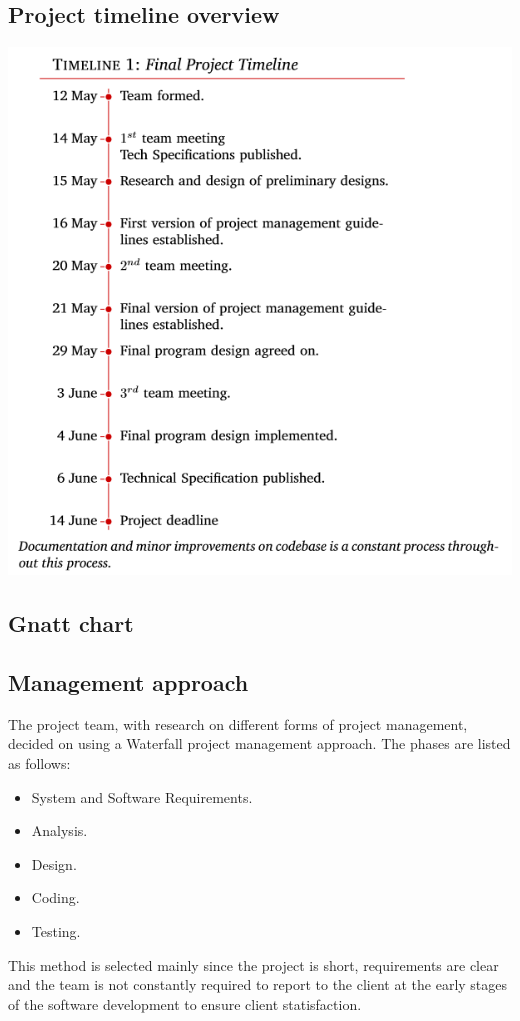 \documentclass[12pt,a4paper]{article}
\begin{document}
	\subsection{Project timeline overview}
	\includegraphics{Timeline.PNG}
	\pagebreak

	\subsection{Gnatt chart}
	\pagebreak

	\subsection{Management approach}
	The project team, with research on different forms of project management, decided on using a Waterfall project
	management approach. The phases are listed as follows: \par
	\begin{itemize}
		\item System and Software Requirements.
		\item Analysis.
		\item Design.
		\item Coding.
		\item Testing.
	\end{itemize}
	This method is selected mainly since the project is short, requirements are clear and the team 
	is not constantly required to report to the client at the early stages of the software development to ensure 
	client statisfaction. \par
\end{document}
